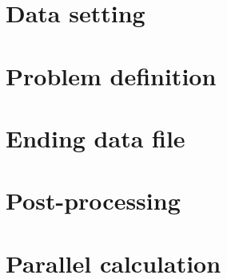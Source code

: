 \documentclass[a4paper,12pt,english]{report}
\begin{document}
%
\chapter{Data setting}
%




%
\chapter{Problem definition}
%




%
\chapter{Ending data file}
%




%
\chapter{Post-processing}
%




%
\chapter{Parallel calculation} \label{parallel}
%




\end{document}
